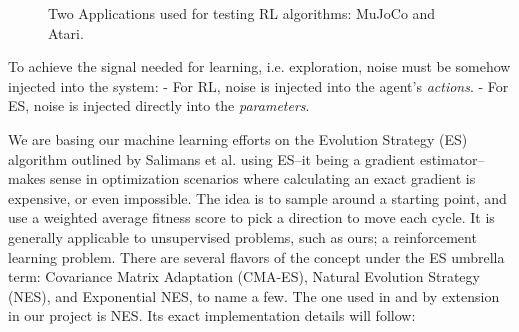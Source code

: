 \begin{figure}[H]
    \centering
    \hfill
    \caption{Two Applications used for testing RL algorithms: MuJoCo and Atari.}
    \label{fig:rl}
\end{figure} 

To achieve the signal needed for learning, i.e. exploration, noise must be somehow injected into the system:
- For RL, noise is injected into the agent's \emph{actions}.
- For ES, noise is injected directly into the \emph{parameters}.

We are basing our machine learning efforts on the Evolution Strategy (ES) algorithm outlined by Salimans et al. \cite{Salimans2017} using ES--it being a gradient estimator--makes sense in optimization scenarios where calculating an exact gradient is expensive, or even impossible. The idea is to sample around a starting point, and use a weighted average fitness score to pick a direction to move each cycle. It is generally applicable to unsupervised problems, such as ours; a reinforcement learning problem. There are several flavors of the concept under the ES umbrella term: Covariance Matrix Adaptation (CMA-ES), Natural Evolution Strategy (NES), and Exponential NES, to name a few. The one used in \cite{Salimans2017} and by extension in our project is NES. Its exact implementation details will follow:

